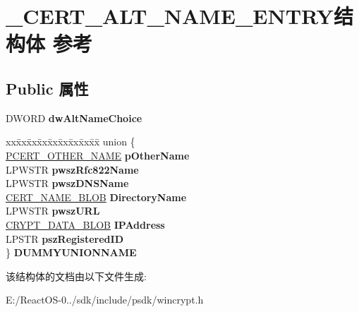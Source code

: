 \hypertarget{struct___c_e_r_t___a_l_t___n_a_m_e___e_n_t_r_y}{}\section{\+\_\+\+C\+E\+R\+T\+\_\+\+A\+L\+T\+\_\+\+N\+A\+M\+E\+\_\+\+E\+N\+T\+R\+Y结构体 参考}
\label{struct___c_e_r_t___a_l_t___n_a_m_e___e_n_t_r_y}
\subsection*{Public 属性}
\begin{DoxyCompactItemize}
\item 
\mbox{\label{struct___c_e_r_t___a_l_t___n_a_m_e___e_n_t_r_y_aac5254c2aefdb0eeacdf3a9ed3b00aab}} 
D\+W\+O\+RD {\bfseries dw\+Alt\+Name\+Choice}
\item 
\mbox{\label{struct___c_e_r_t___a_l_t___n_a_m_e___e_n_t_r_y_a253ebb2f90d8828d8aac5327a29af89a}} 
\begin{tabbing}
xx\=xx\=xx\=xx\=xx\=xx\=xx\=xx\=xx\=\kill
union \{\\
\>\hyperlink{struct___c_e_r_t___o_t_h_e_r___n_a_m_e}{PCERT\_OTHER\_NAME} {\bfseries pOtherName}\\
\>LPWSTR {\bfseries pwszRfc822Name}\\
\>LPWSTR {\bfseries pwszDNSName}\\
\>\hyperlink{struct___c_r_y_p_t_o_a_p_i___b_l_o_b}{CERT\_NAME\_BLOB} {\bfseries DirectoryName}\\
\>LPWSTR {\bfseries pwszURL}\\
\>\hyperlink{struct___c_r_y_p_t_o_a_p_i___b_l_o_b}{CRYPT\_DATA\_BLOB} {\bfseries IPAddress}\\
\>LPSTR {\bfseries pszRegisteredID}\\
\} {\bfseries DUMMYUNIONNAME}\\

\end{tabbing}\end{DoxyCompactItemize}


该结构体的文档由以下文件生成\+:\begin{DoxyCompactItemize}
\item 
E\+:/\+React\+O\+S-\/0../sdk/include/psdk/wincrypt.\+h\end{DoxyCompactItemize}
